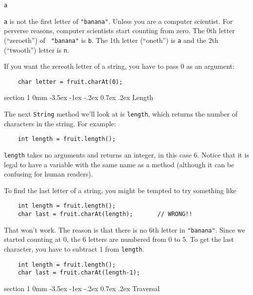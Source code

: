 \documentclass{book}
\makeatletter
\renewcommand{\section}{\@startsection 
    {section} {1} {0mm}%
    {-3.5ex \@plus -1ex \@minus -.2ex}%
    {0.7ex \@plus.2ex}%
    {\normalfont\Large\bfseries}}
\makeatother
\begin{document}
\begin{verbatim}
a
\end{verbatim}
%
{\tt a} is not the first letter of {\tt "banana"}.  Unless you are a
computer scientist.  For perverse reasons, computer scientists
start counting from zero.  The 0th letter (``zeroeth'') of {\tt
"banana"} is {\tt b}.  The 1th letter (``oneth'') is {\tt a} and the
2th (``twooth'') letter is {\tt n}.

If you want the zereoth letter of a string, you have to pass
0 as an argument:

\begin{verbatim}
    char letter = fruit.charAt(0);
\end{verbatim}


\section{Length}

The next {\tt String} method we'll look at is {\tt length}, which
returns the number of characters in the string.  For example:

\begin{verbatim}
    int length = fruit.length();
\end{verbatim}
%
{\tt length} takes no arguments
and returns an integer, in this case 6.  Notice that it is
legal to have a variable with the same name as a method (although
it can be confusing for human readers).

To find the last letter of a string, you might be tempted to
try something like

\begin{verbatim}
    int length = fruit.length();
    char last = fruit.charAt(length);       // WRONG!!
\end{verbatim}
%
That won't work.  The reason is that there is no 6th letter
in {\tt "banana"}.  Since we started counting at 0, the 6
letters are numbered from 0 to 5.  To get the last character,
you have to subtract 1 from {\tt length}.

\begin{verbatim}
    int length = fruit.length();
    char last = fruit.charAt(length-1);
\end{verbatim}


\section{Traversal}
\label{traverse}
\end{document}
